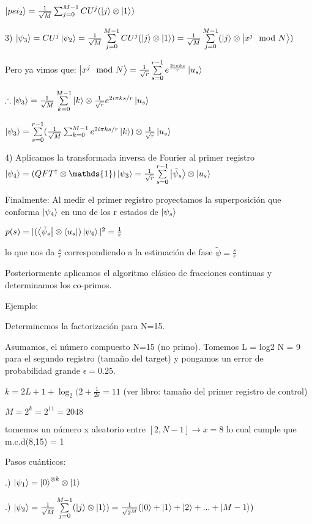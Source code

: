 $\ket{psi_2} = \frac{1}{\sqrt{M}} \sum_{j=0}^{M-1} CU^j (\ket{j} \otimes \ket{1})$

3) $\ket{\psi_3} = CU^j \ket{\psi_2} = \frac{1}{\sqrt{M}} \sum\limits_{j=0}^{M-1} CU^j (\ket{j} \otimes \ket{1}) = \frac{1}{\sqrt{M}} \sum\limits_{j=0}^{M-1} (\ket{j} \otimes \ket{x^j \mod N})$

Pero ya vimos que: $\ket{x^j \mod N} = \frac{1}{\sqrt{r}} \sum\limits_{s=0}^{r-1} e^{\frac{2 i \pi k s}{r}} \ket{u_s}$

$\therefore \ket{\psi_3} = \frac{1}{\sqrt{M}} \sum\limits_{k=0}^{M-1} \ket{k} \otimes \frac{1}{\sqrt{r}} e^{2 i \pi k s/r} \ket{u_s}$

$\ket{\psi_3} = \sum\limits_{s=0}^{r-1} (\frac{1}{\sqrt{M}} \sum_{k=0}^{M-1} e^{2 i \pi k s/r} \ket{k}) \otimes \frac{1}{\sqrt{r}} \ket{u_s}$

4) Aplicamos la transformada inversa de Fourier al primer registro $\ket{\psi_4} = (QFT^\dagger \otimes \mathds{1}) \ket{\psi_3} = \frac{1}{\sqrt{r}} \sum\limits_{s=0}^{r-1} \ket{\tilde{\psi}_s} \otimes \ket{u_s}$

Finalmente: Al medir el primer registro proyectamos la superposición que conforma $\ket{\psi_4}$ en uno de los r estados de $\ket{\psi_s}$

$p(s) = |(\bra{\tilde{\psi}_s} \otimes \bra{u_s}) \ket{\psi_4}|^2 = \frac{1}{r}$

lo que nos da $\frac{s}{r}$ correspondiendo a la estimación de fase $\tilde{\psi} = \frac{s}{r}$

Posteriormente aplicamos el algoritmo clásico de fracciones continuas y determinamos los co-primos.

Ejemplo:

Determinemos la factorización para N=15.

Asumamos, el número compuesto N=15 (no primo). Tomemos L = log2 N = 9 para el segundo registro (tamaño del target) y pongamos un error de probabilidad grande $\epsilon = 0.25$.

$k = 2L + 1 + \log_2(2 + \frac{1}{2 \varepsilon} = 11$ (ver libro: tamaño del primer registro de control)

$M = 2^k = 2^{11} = 2048$

tomemos un número x aleatorio entre $[2, N-1] \rightarrow x = 8$ lo cual cumple que m.c.d(8,15) = 1

Pasos cuánticos:

.) $\ket{\psi_1} = \ket{0}^{\otimes k} \otimes \ket{1}$

.) $\ket{\psi_2} = \frac{1}{\sqrt{M}} \sum\limits_{j=0}^{M-1} (\ket{j} \otimes \ket{1}) = \frac{1}{\sqrt{2^M}} (\ket{0} + \ket{1} + \ket{2} + ... + \ket{M-1})$

